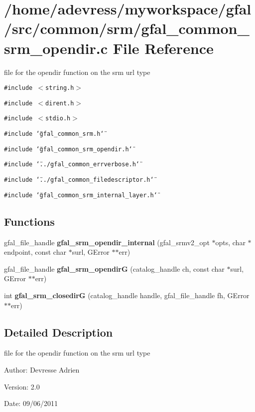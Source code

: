 \section{/home/adevress/myworkspace/gfal/src/common/srm/gfal\_\-common\_\-srm\_\-opendir.c File Reference}
\label{gfal__common__srm__opendir_8c}
file for the opendir function on the srm url type 

{\tt \#include $<$string.h$>$}\par
{\tt \#include $<$dirent.h$>$}\par
{\tt \#include $<$stdio.h$>$}\par
{\tt \#include \char`\"{}gfal\_\-common\_\-srm.h\char`\"{}}\par
{\tt \#include \char`\"{}gfal\_\-common\_\-srm\_\-opendir.h\char`\"{}}\par
{\tt \#include \char`\"{}../gfal\_\-common\_\-errverbose.h\char`\"{}}\par
{\tt \#include \char`\"{}../gfal\_\-common\_\-filedescriptor.h\char`\"{}}\par
{\tt \#include \char`\"{}gfal\_\-common\_\-srm\_\-internal\_\-layer.h\char`\"{}}\par
\subsection*{Functions}
\begin{CompactItemize}
\item 
gfal\_\-file\_\-handle \textbf{gfal\_\-srm\_\-opendir\_\-internal} (gfal\_\-srmv2\_\-opt $\ast$opts, char $\ast$endpoint, const char $\ast$surl, GError $\ast$$\ast$err)\label{gfal__common__srm__opendir_8c_328539269e85b42a470ed35e16aa0be7}

\item 
gfal\_\-file\_\-handle \textbf{gfal\_\-srm\_\-opendir\-G} (catalog\_\-handle ch, const char $\ast$surl, GError $\ast$$\ast$err)\label{gfal__common__srm__opendir_8c_98735cc394e8308aff0d47bb13fda64f}

\item 
int \textbf{gfal\_\-srm\_\-closedir\-G} (catalog\_\-handle handle, gfal\_\-file\_\-handle fh, GError $\ast$$\ast$err)\label{gfal__common__srm__opendir_8c_a9f63a5ff1be26668963f98f2fba9733}

\end{CompactItemize}


\subsection{Detailed Description}
file for the opendir function on the srm url type 

\begin{Desc}
\item[Author:]Devresse Adrien \end{Desc}
\begin{Desc}
\item[Version:]2.0 \end{Desc}
\begin{Desc}
\item[Date:]09/06/2011 \end{Desc}
